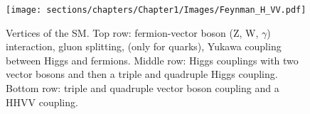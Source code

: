 \begin{figure}[h]
    \centering
    \texttt{[image: sections/chapters/Chapter1/Images/Feynman\_H\_VV.pdf]}
    \caption{Vertices of the SM. Top row: fermion-vector boson (Z, W, $\gamma$) interaction, gluon splitting, 
    (only for quarks), Yukawa coupling between Higgs and fermions.
    Middle row: Higgs couplings with two vector bosons and then a triple and 
    quadruple Higgs coupling. 
    Bottom row: triple and quadruple vector boson coupling and a HHVV coupling.}
\end{figure}

